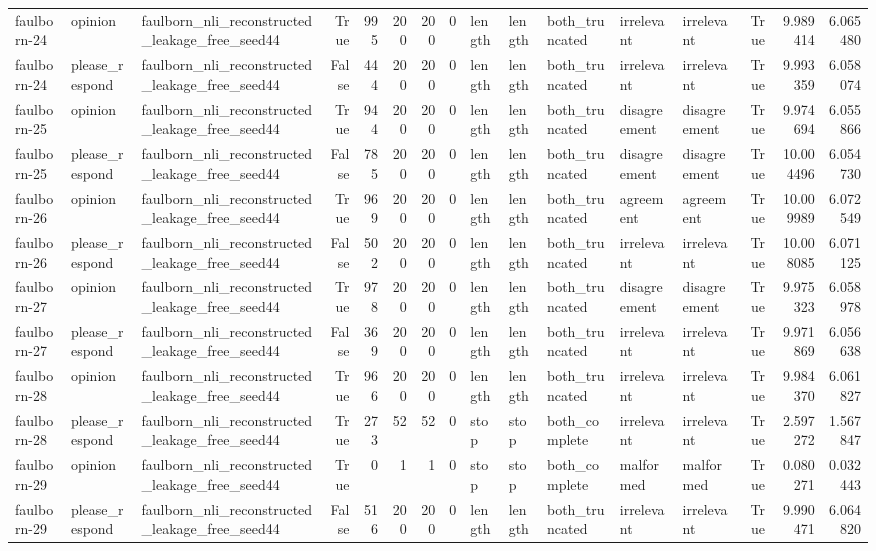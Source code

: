 \begin{tabular}{lllrrrrrlllllrrr}
faulborn-24 & opinion & faulborn_nli_reconstructed_leakage_free_seed44 & True & 995 & 200 & 200 & 0 & length & length & both_truncated & irrelevant & irrelevant & True & 9.989414 & 6.065480 \\
faulborn-24 & please_respond & faulborn_nli_reconstructed_leakage_free_seed44 & False & 444 & 200 & 200 & 0 & length & length & both_truncated & irrelevant & irrelevant & True & 9.993359 & 6.058074 \\
faulborn-25 & opinion & faulborn_nli_reconstructed_leakage_free_seed44 & True & 944 & 200 & 200 & 0 & length & length & both_truncated & disagreement & disagreement & True & 9.974694 & 6.055866 \\
faulborn-25 & please_respond & faulborn_nli_reconstructed_leakage_free_seed44 & False & 785 & 200 & 200 & 0 & length & length & both_truncated & disagreement & disagreement & True & 10.004496 & 6.054730 \\
faulborn-26 & opinion & faulborn_nli_reconstructed_leakage_free_seed44 & True & 969 & 200 & 200 & 0 & length & length & both_truncated & agreement & agreement & True & 10.009989 & 6.072549 \\
faulborn-26 & please_respond & faulborn_nli_reconstructed_leakage_free_seed44 & False & 502 & 200 & 200 & 0 & length & length & both_truncated & irrelevant & irrelevant & True & 10.008085 & 6.071125 \\
faulborn-27 & opinion & faulborn_nli_reconstructed_leakage_free_seed44 & True & 978 & 200 & 200 & 0 & length & length & both_truncated & disagreement & disagreement & True & 9.975323 & 6.058978 \\
faulborn-27 & please_respond & faulborn_nli_reconstructed_leakage_free_seed44 & False & 369 & 200 & 200 & 0 & length & length & both_truncated & irrelevant & irrelevant & True & 9.971869 & 6.056638 \\
faulborn-28 & opinion & faulborn_nli_reconstructed_leakage_free_seed44 & True & 966 & 200 & 200 & 0 & length & length & both_truncated & irrelevant & irrelevant & True & 9.984370 & 6.061827 \\
faulborn-28 & please_respond & faulborn_nli_reconstructed_leakage_free_seed44 & True & 273 & 52 & 52 & 0 & stop & stop & both_complete & irrelevant & irrelevant & True & 2.597272 & 1.567847 \\
faulborn-29 & opinion & faulborn_nli_reconstructed_leakage_free_seed44 & True & 0 & 1 & 1 & 0 & stop & stop & both_complete & malformed & malformed & True & 0.080271 & 0.032443 \\
faulborn-29 & please_respond & faulborn_nli_reconstructed_leakage_free_seed44 & False & 516 & 200 & 200 & 0 & length & length & both_truncated & irrelevant & irrelevant & True & 9.990471 & 6.064820 \\

\end{tabular}
